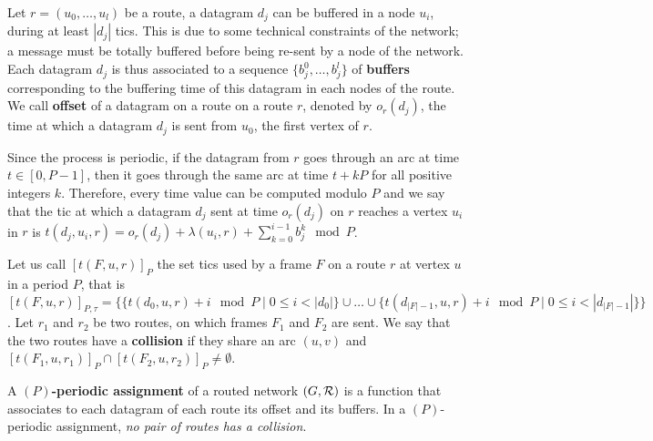 \documentclass[10pt]{article}
\begin{document}
      Let $r=(u_0,\dots,u_l)$ be a route, a datagram $d_j$ can be buffered in a node $u_i$, during at least $|d_j|$ tics.
      This is due to some technical constraints of the network; a message must be totally buffered before being re-sent by a node of the network.
       Each datagram $d_j$ is thus associated to a sequence $\{b_j^0,\ldots,b_j^l\}$ of \textbf{buffers} corresponding to the buffering time of this datagram in each nodes of the route. We call \textbf{offset} of a datagram on a route on a route $r$, denoted by $o_r(d_j)$, the time at which a datagram $d_j$ is sent from $u_0$, the first vertex of $r$. 
       
      Since the process is periodic, if the datagram from $r$ goes through an arc at time $t\in [0,P-1]$,  then it goes through the same arc at time $t+kP$ for all positive integers $k$. Therefore, every time value can be computed modulo $P$ and we say that the tic at which a datagram $d_j$ sent at time $o_r(d_j)$ on $r$ reaches a vertex $u_i$ in $r$ is $t(d_j,u_i,r) = o_r(d_j) + \lambda(u_i,r) + \sum_{k=0}^{i-1}b_j^k \mod P$. 
      
      
       Let us call $[t(F,u,r)]_{P}$ the set tics used by a frame $F$ on a route $r$ at vertex $u$ in a period $P$, that is $[t(F,u,r)]_{P,\tau} = \{ \{t(d_0,u,r) + i \mod P \mid 0 \leq i < |d_0|\} \cup \ldots \cup \{ t(d_{|F|-1},u,r) + i \mod P \mid 0 \leq i < |d_{|F| -1}|\}  \}$.
      Let $r_1$ and $r_2$ be two routes, on which frames $F_1$ and $F_2$ are sent.
      We say that the two routes have a {\bf collision} if they share an arc $(u,v)$ and $[t(F_1,u,r_{1})]_{P} \cap [t(F_2,u,r_{2})]_{P} \neq \emptyset$.
      
         A {\bf $(P)$-periodic assignment} of a routed network $(G,\cal R)$ is a function that associates to each datagram of each route  its offset and its buffers. In a $(P)$-periodic assignment, \emph{no pair of routes has a collision}.
	 
\end{document}
